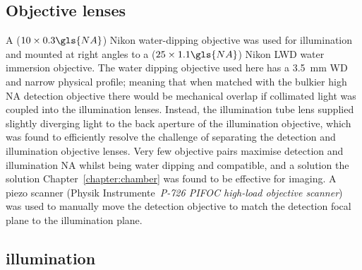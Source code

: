 \subsection{Objective lenses}


A (\emph{\(10\times 0.3 \gls{NA}\)}) Nikon water-dipping objective was used for illumination and mounted at right angles to a (\emph{\(25\times1.1 \gls{NA}\)}) Nikon LWD water immersion objective.
The water dipping objective used here has a \SI{3.5}{\milli\meter} WD and narrow physical profile; meaning that when matched with the bulkier high NA detection objective
there would be mechanical overlap if collimated light was coupled into the illumination lenses.
Instead, the illumination tube lens supplied slightly diverging light to the back aperture of the illumination objective, which was found to efficiently resolve the challenge of separating the detection and illumination objective lenses.
Very few objective pairs maximise detection and illumination \gls{NA} whilst being water dipping and compatible, and a solution the solution Chapter~\ref{chapter:chamber} was found to be effective for imaging.
A piezo scanner (Physik Instrumente~\emph{P-726 PIFOC high-load objective scanner}) was used to manually move the detection objective to match the detection focal plane to the illumination plane.

\subsection{illumination}

